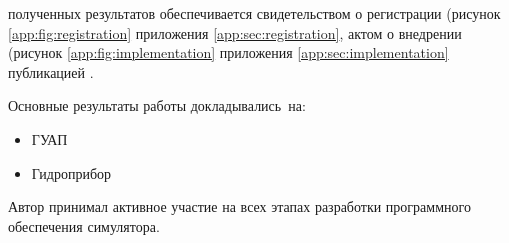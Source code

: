 {\reliability} полученных результатов обеспечивается
  свидетельством о регистрации (рисунок \ref{app:fig:registration} приложения \ref{app:sec:registration},
  актом о внедрении (рисунок \ref{app:fig:implementation} приложения \ref{app:sec:implementation}  
  публикацией \cite{bib:my:ttd_with_patterns_2019}.


\todo{{\probation}}
Основные результаты работы докладывались~на:
\begin{itemize}
  \item ГУАП
  \item Гидроприбор
\end{itemize}

{\contribution} Автор принимал активное участие на всех этапах разработки программного обеспечения симулятора.
